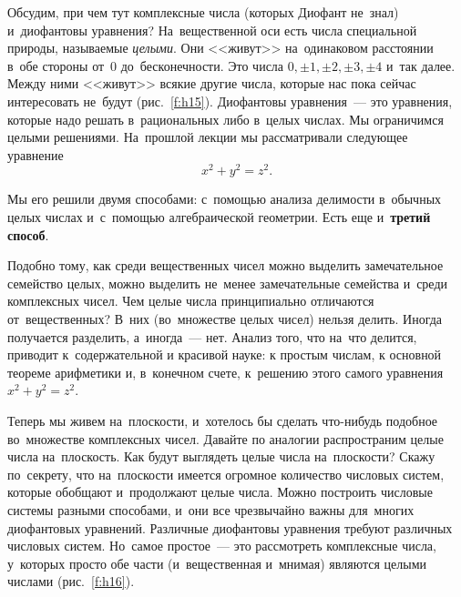 Обсудим, при чем тут комплексные числа (которых Диофант не~знал) и~диофантовы уравнения?
На~вещественной оси есть числа специальной природы, называемые \textit{целыми}. Они <<живут>> на~одинаковом
расстоянии в~обе стороны от~0 до~бесконечности. Это числа $0,\pm1,\pm2,\pm3,\pm4$  и~так далее.
 Между ними <<живут>>
всякие другие числа, которые нас пока сейчас интересовать не~будут (рис.~\ref{f:h15}). Диофантовы
уравнения~--- это уравнения, которые надо решать в~рациональных либо в~целых числах. Мы ограничимся
целыми решениями. На~прошлой лекции мы рассматривали следующее уравнение $$x^{2}+y^{2}=z^{2}.$$


Мы его решили двумя способами: с~помощью анализа делимости в~обычных целых числах и~с~помощью
алгебраической геометрии. Есть еще и~\textbf{третий способ}.


Подобно тому, как среди вещественных чисел можно выделить замечательное семейство целых, можно
выделить не~менее замечательные семейства и~среди комплексных чисел. Чем целые числа принципиально
отличаются от~вещественных? В~них (во~множестве целых чисел) нельзя делить. Иногда получается
разделить, а~иногда~--- нет. Анализ того, что на~что делится, приводит к~содержательной и красивой науке:
к простым числам, к основной теореме арифметики и, в~конечном счете, к~решению этого самого уравнения
$x^{2}+y^{2}=z^{2}$.

Теперь мы живем на~плоскости, и~хотелось бы сделать что-нибудь подобное во~множестве комплексных
чисел. Давайте по аналогии распространим целые числа на~плоскость. Как будут выглядеть целые числа
на~плоскости? Скажу по~секрету, что на~плоскости имеется огромное количество числовых систем, которые
обобщают и~продолжают целые числа.
 Можно построить числовые системы разными способами, и~они все
чрезвычайно важны для~многих диофантовых уравнений. Различные диофантовы уравнения требуют
различных числовых систем. Но~самое простое~--- это рассмотреть комплексные числа, у~которых просто
обе части (и~вещественная и~мнимая) являются целыми числами (рис.~\ref{f:h16}).

%
%


